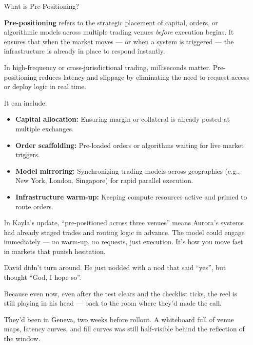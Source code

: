 \begin{TechnicalSidebar}{What is Pre-Positioning?}

  \textbf{Pre-positioning} refers to the strategic placement of capital, orders, or algorithmic models across multiple 
  trading venues \textit{before} execution begins.  
  It ensures that when the market moves — or when a system is triggered — the infrastructure is already in place to 
  respond instantly.

  \medskip

  In high-frequency or cross-jurisdictional trading, milliseconds matter.  
  Pre-positioning reduces latency and slippage by eliminating the need to request access or deploy logic in real time.

  \medskip

  It can include:

  \begin{itemize}
    \item \textbf{Capital allocation:} Ensuring margin or collateral is already posted at multiple exchanges.
    \item \textbf{Order scaffolding:} Pre-loaded orders or algorithms waiting for live market triggers.
    \item \textbf{Model mirroring:} Synchronizing trading models across geographies (e.g., New York, London, Singapore) 
    for rapid parallel execution.
    \item \textbf{Infrastructure warm-up:} Keeping compute resources active and primed to route orders.
  \end{itemize}

  \medskip

  In Kayla’s update, “pre-positioned across three venues” means Aurora’s systems had already staged trades and routing 
  logic in advance.  
  The model could engage immediately — no warm-up, no requests, just execution. It’s how you move fast in markets that 
  punish hesitation.

\end{TechnicalSidebar}

\medskip

David didn’t turn around. He just nodded with a nod that said ``yes'', but thought ``God, I hope so''.

Because even now, even after the test clears and the checklist ticks, the reel is still playing in his head — 
back to the room where they’d made the call.

They’d been in Geneva, two weeks before rollout. A whiteboard full of venue maps, latency curves, and fill 
curves was still half-visible behind the reflection of the window.

